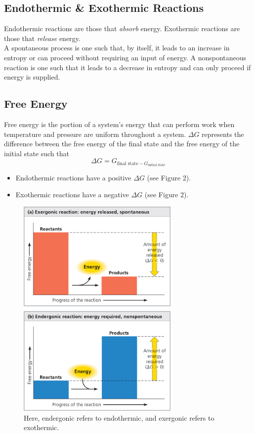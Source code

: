 \documentclass[a4paper]{article}
\begin{document}
\subsection{Endothermic \& Exothermic Reactions}

\color{red}Endothermic reactions \color{black} are those that \textit{absorb} energy. 
\color{red}Exothermic reactions \color{black} are those that \textit{release} energy.\\

A \color{red} spontaneous process \color{black} is one such that, by itself, it leads to an increase in entropy or can proceed without requiring an input of energy. A \color{red} nonspontaneous reaction \color{black} is one such that it leads to a decrease in entropy and can only proceed if energy is supplied.

\subsection{Free Energy}
\color{red}Free energy \color{black} is the portion of a system's energy that can perform work when temperature and pressure are uniform throughout a system. $\Delta G$ represents the difference between the free energy of the final state and the free energy of the initial state such that $$\Delta G = G_{\text{final state} - G_{\text{initial state}}} $$

\begin{itemize}
	\item Endothermic reactions have a positive $\Delta G$ (see Figure 2).
	\item Exothermic reactions have a negative $\Delta G$ (see Figure 2).
\end{itemize}

\begin{figure}[h!]
\centering
\includegraphics[width=0.7\textwidth]{figure_two.jpeg}
\caption{Here, endergonic refers to endothermic, and exergonic refers to exothermic.}
\end{figure}
\end{document}
